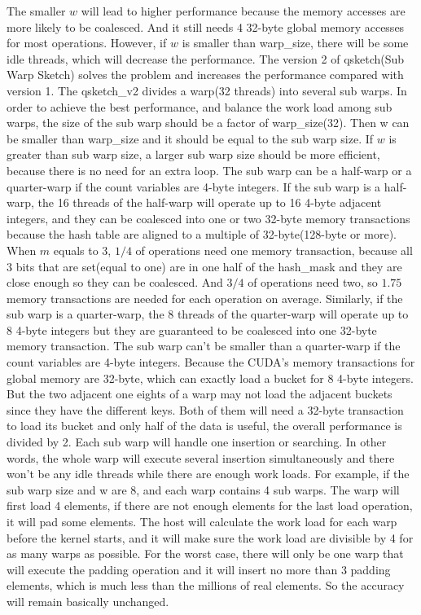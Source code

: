\documentclass[conference]{IEEEtran}
\begin{document}
The smaller $w$ will lead to higher performance because the memory accesses are more likely to be coalesced. And it still needs 4 32-byte global memory accesses for most operations. However, if $w$ is smaller than warp\_size, there will be some idle threads, which will decrease the performance. The version 2 of qsketch(Sub Warp Sketch) solves the problem and increases the performance compared with version 1. The qsketch\_v2 divides a warp(32 threads) into several sub warps. In order to achieve the best performance, and balance the work load among sub warps, the size of the sub warp should be a factor of warp\_size(32). Then w can be smaller than warp\_size and it should be equal to the sub warp size. If $w$ is greater than sub warp size, a larger sub warp size should be more efficient, because there is no need for an extra loop. The sub warp can be a half-warp or a quarter-warp if the count variables are 4-byte integers. If the sub warp is a half-warp, the 16 threads of the half-warp will operate up to 16 4-byte adjacent integers, and they can be coalesced into one or two 32-byte memory transactions because the hash table are aligned to a multiple of 32-byte(128-byte or more). When $m$ equals to 3, $1/4$ of operations need one memory transaction, because all 3 bits that are set(equal to one) are in one half of the hash\_mask and they are close enough so they can be coalesced. And $3/4$ of operations need two, so $1.75$ memory transactions are needed for each operation on average. Similarly, if the sub warp is a quarter-warp, the 8 threads of the quarter-warp will operate up to 8 4-byte integers but they are guaranteed to be coalesced into one 32-byte memory transaction.
The sub warp can't be smaller than a quarter-warp if the count variables are 4-byte integers. Because the CUDA's memory transactions for global memory are 32-byte, which can exactly load a bucket for 8 4-byte integers. But the two adjacent one eights of a warp may not load the adjacent buckets since they have the different keys. Both of them will need a 32-byte transaction to load its bucket and only half of the data is useful, the overall performance is divided by 2.
Each sub warp will handle one insertion or searching. In other words, the whole warp will execute several insertion simultaneously and there won’t be any idle threads while there are enough work loads. For example, if the sub warp size and w are 8, and each warp contains 4 sub warps. The warp will first load 4 elements, if there are not enough elements for the last load operation, it will pad some elements. The host will calculate the work load for each warp before the kernel starts, and it will make sure the work load are divisible by 4 for as many warps as possible. For the worst case, there will only be one warp that will execute the padding operation and it will insert no more than 3 padding elements, which is much less than the millions of real elements. So the accuracy will remain basically unchanged. 
\end{document}
